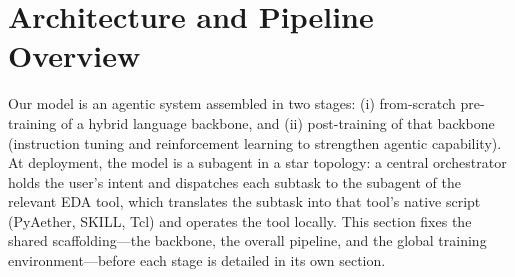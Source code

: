 ﻿\section{Architecture and Pipeline Overview}\label{sec:overview}

Our model is an agentic system assembled in two stages: (i) from-scratch pre-training of a hybrid language backbone, and (ii) post-training of that backbone (instruction tuning and reinforcement learning to strengthen agentic capability).
At deployment, the model is a subagent in a star topology: a central orchestrator holds the user's intent and dispatches each subtask to the subagent of the relevant EDA tool, which translates the subtask into that tool's native script (PyAether, SKILL, Tcl) and operates the tool locally.
This section fixes the shared scaffolding---the backbone, the overall pipeline, and the global training environment---before each stage is detailed in its own section.

